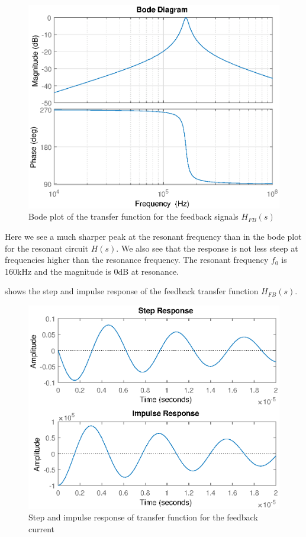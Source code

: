 \begin{figure}[H]
    \centering
    \includegraphics[width=\textwidth]{img/FeedBackBode.eps}
    \caption{Bode plot of the transfer function for the feedback signals $H_{FB}(s)$}
    \label{fig:fb_bode}
\end{figure}

Here we see a much sharper peak at the resonant frequency than in the bode plot for the resonant circuit $H(s)$. We also see that the response is not less steep at frequencies higher than the resonance frequency. The resonant frequency $f_0$ is 160kHz and the magnitude is 0dB at resonance.


 shows the step and impulse response of the feedback transfer function $H_{FB}(s)$.

\begin{figure}[H]
    \centering
    \includegraphics[width=\textwidth]{img/FeedBackResponse.eps}
    \caption{Step and impulse response of transfer function for the feedback current}
    \label{fig:fb_step}
\end{figure}

